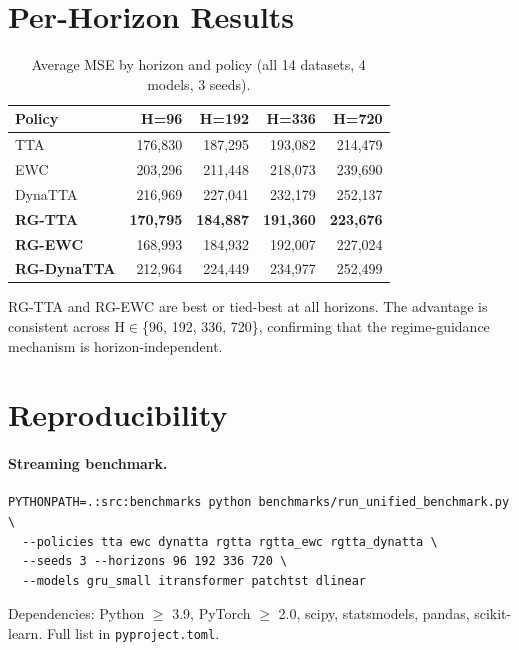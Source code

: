 \documentclass[11pt,a4paper]{article}
\begin{document}
\section{Per-Horizon Results}
\label{app:horizons}

\begin{table}[t]
\centering
\caption{Average MSE by horizon and policy (all 14 datasets, 4 models, 3 seeds).}
\label{tab:horizons}
\small
\begin{tabular}{lrrrr}
\toprule
Policy & H=96 & H=192 & H=336 & H=720 \\
\midrule
TTA & 176,830 & 187,295 & 193,082 & 214,479 \\
EWC & 203,296 & 211,448 & 218,073 & 239,690 \\
DynaTTA & 216,969 & 227,041 & 232,179 & 252,137 \\
\midrule
\textbf{RG-TTA} & \textbf{170,795} & \textbf{184,887} & \textbf{191,360} & \textbf{223,676} \\
\textbf{RG-EWC} & 168,993 & 184,932 & 192,007 & 227,024 \\
\textbf{RG-DynaTTA} & 212,964 & 224,449 & 234,977 & 252,499 \\
\bottomrule
\end{tabular}
\end{table}

RG-TTA and RG-EWC are best or tied-best at all horizons. The advantage is consistent across H$\in$\{96, 192, 336, 720\}, confirming that the regime-guidance mechanism is horizon-independent.

\section{Reproducibility}
\label{app:reproduce}

\paragraph{Streaming benchmark.}
\begin{verbatim}
PYTHONPATH=.:src:benchmarks python benchmarks/run_unified_benchmark.py \
  --policies tta ewc dynatta rgtta rgtta_ewc rgtta_dynatta \
  --seeds 3 --horizons 96 192 336 720 \
  --models gru_small itransformer patchtst dlinear
\end{verbatim}

Dependencies: Python $\geq$ 3.9, PyTorch $\geq$ 2.0, scipy, statsmodels, pandas, scikit-learn. Full list in \texttt{pyproject.toml}.
\end{document}
